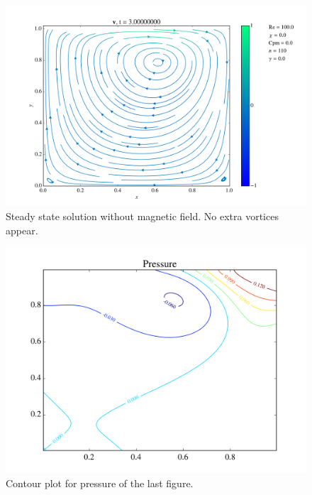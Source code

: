 \documentclass[journal]{IEEEtran}
\begin{document}
\begin{figure}[!t]
\centering
\includegraphics[width=\linewidth]{figures/Re100/n/vectorField}
\caption{Steady state solution without magnetic field. No extra vortices appear. \label{Re100nVectorField}}
\end{figure}

\begin{figure}[!t]
\centering
\includegraphics[width=\linewidth]{figures/Re100/n/pressure}
\caption{Contour plot for pressure of the last figure. \label{Re100nPressure}}
\end{figure}
\end{document}
